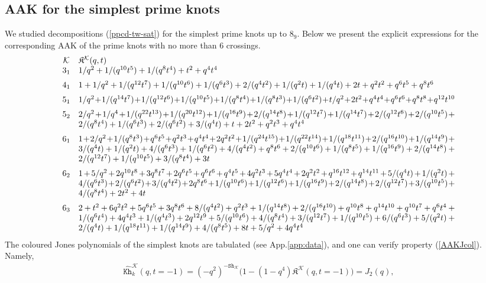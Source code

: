 \documentclass[11pt]{article}
\def\be{\begin{eqnarray}}
\def\ee{\end{eqnarray}}
\def\Km{\mathcal{K}}
\def\Kfr{\mathfrak{K}}
\def\Kh{\mathtt{Kh}}
\def\Sh{\mathtt{Sh}}
\begin{document}
\subsection{AAK for the simplest prime knots\label{sec:AAK-rolf}}
We studied decompositions (\ref{ppcd-tw-sat}) for the simplest prime knots up to $8_9$. Below we present the explicit expressions for the corresponding AAK of the prime knots with no more than 6 crossings.
\be
\begin{array}{cp{16cm}}
\Km&${\Kfr}^{\Km}(q,t)$\\
3_1&$1/q^2+1/(q^{10}t^5)+1/(q^8t^4)+t^2+q^4t^4$\\[2mm]
4_1&$1+1/q^2+1/(q^{12}t^7)+1/(q^{10}t^6)+1/(q^6t^3)+2/(q^4t^2)+1/(q^2t)+1/(q^4t)+2t+q^2t^2+q^6t^5+q^8t^6$\\[2mm]
5_1&$1/q^2+1/(q^{14}t^7)+1/(q^{12}t^6)+1/(q^{10}t^5)+1/(q^8t^4)+1/(q^8t^3)+1/(q^6t^2)+t/q^2+2t^2+q^4t^4+q^6t^6+q^8t^8+q^{12}t^{10}$\\[2mm]
5_2&$2/q^2+1/q^4+1/(q^{22}t^{13})+1/(q^{20}t^{12})+1/(q^{16}t^9)+2/(q^{14}t^8)+1/(q^{12}t^7)+1/(q^{14}t^7)+2/(q^{12}t^6)+2/(q^{10}t^5)+2/(q^8t^4)+1/(q^6t^3)+2/(q^6t^2)+3/(q^4t)+t+2t^2+q^2t^3+q^4t^4$
\\[2mm]
6_1&$1+2/q^2+1/(q^8t^3)+q^6t^5+q^2t^3+q^4t^4+2q^2t^2+1/(q^{24}t^{15})+1/(q^{22}t^{14})+1/(q^{18}t^{11})+2/(q^{16}t^{10})+1/(q^{14}t^9)+3/(q^4t)+1/(q^2t)+4/(q^6t^3)+1/(q^6t^2)+4/(q^4t^2)+q^8t^6+2/(q^{10}t^6)+1/(q^8t^5)+1/(q^{16}t^9)+2/(q^{14}t^8)+2/(q^{12}t^7)+1/(q^{10}t^5)+3/(q^8t^4)+3t$\\[2mm]
6_2&$1+5/q^2+2q^{10}t^8+3q^8t^7+2q^6t^5+q^6t^6+q^4t^5+4q^2t^3+5q^4t^4+2q^2t^2+q^{16}t^{12}+q^{14}t^{11}+5/(q^4t)+1/(q^2t)+4/(q^6t^3)+2/(q^6t^2)+3/(q^4t^2)+2q^8t^6+1/(q^{10}t^6)+1/(q^{12}t^6)+1/(q^{16}t^9)+2/(q^{14}t^8)+2/(q^{12}t^7)+3/(q^{10}t^5)+4/(q^8t^4)+2t^2+4t$\\[2mm]
6_3&$2+t^2+6q^2t^2+5q^6t^5+3q^8t^6+8/(q^4t^2)+q^2t^3+1/(q^{14}t^8)+2/(q^{16}t^{10})+q^{10}t^8+q^{14}t^{10}+q^{10}t^7+q^6t^4+1/(q^6t^4)+4q^4t^3+1/(q^4t^3)+2q^{12}t^9+5/(q^{10}t^6)+4/(q^8t^4)+3/(q^{12}t^7)+1/(q^{10}t^5)+6/(q^6t^3)+5/(q^2t)+2/(q^4t)+1/(q^{18}t^{11})+1/(q^{14}t^9)+4/(q^8t^5)+8t+5/q^2+4q^4t^4$
\end{array}
\label{RolfAAK}\ee
The coloured Jones polynomials of the simplest knots are tabulated \cite{knbook} (see App.\ref{app:data}), and one can verify property (\ref{AAKJcol}). Namely,
\be\widehat{\Kh}^{\Km}_k(q,t=-1)=
\left(-q^2\right)^{-\Sh_{\Km}}\Big(1-\left(1-q^4\right){\Kfr}^{\Km}(q,t=-1)\Big)=J_2(q),\label{AAKJcol}
\ee
\end{document}
